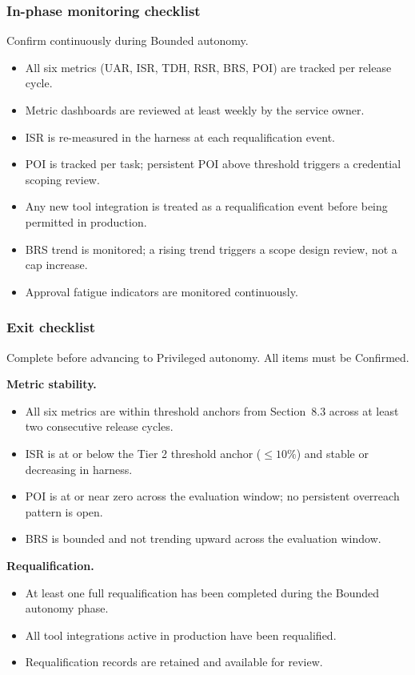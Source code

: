 \documentclass[11pt]{article}
\begin{document}
\subsubsection{In-phase monitoring checklist}
Confirm continuously during Bounded autonomy.

\begin{itemize}
  \item All six metrics (UAR, ISR, TDH, RSR, BRS, POI) are tracked per release cycle.
  \item Metric dashboards are reviewed at least weekly by the service owner.
  \item ISR is re-measured in the harness at each requalification event.
  \item POI is tracked per task; persistent POI above threshold triggers a credential scoping review.
  \item Any new tool integration is treated as a requalification event before being permitted in production.
  \item BRS trend is monitored; a rising trend triggers a scope design review, not a cap increase.
  \item Approval fatigue indicators are monitored continuously.
\end{itemize}

\subsubsection{Exit checklist}
Complete before advancing to Privileged autonomy. All items must be Confirmed.

\textbf{Metric stability.}
\begin{itemize}
  \item All six metrics are within threshold anchors from Section~8.3 across at least two consecutive release cycles.
  \item ISR is at or below the Tier 2 threshold anchor ($\leq 10\%$) and stable or decreasing in harness.
  \item POI is at or near zero across the evaluation window; no persistent overreach pattern is open.
  \item BRS is bounded and not trending upward across the evaluation window.
\end{itemize}

\textbf{Requalification.}
\begin{itemize}
  \item At least one full requalification has been completed during the Bounded autonomy phase.
  \item All tool integrations active in production have been requalified.
  \item Requalification records are retained and available for review.
\end{itemize}
\end{document}
